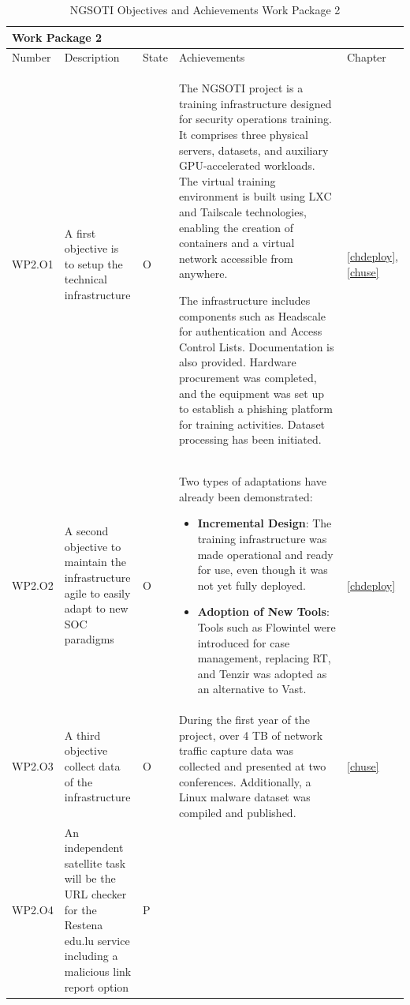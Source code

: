 \begin{table}[h]
\centering

\begin{tabular}{ |p{0.07\linewidth}  |p{0.2\linewidth}|        p{0.04\linewidth}|    p{0.62\linewidth}|  p{0.07\linewidth}|}\hline
\multicolumn{5}{|p{0.97\linewidth}|}{Work Package 2} \\
\hline
                  Number             & Description & State & Achievements & Chapter \\
\hline
WP2.O1 &
A first objective is to setup the technical infrastructure & O &

The NGSOTI project is a training infrastructure designed for security
operations training. It comprises three physical servers, datasets, and
auxiliary GPU-accelerated workloads. The virtual training environment is
built using LXC and Tailscale technologies, enabling the creation of
containers and a virtual network accessible from anywhere.

The infrastructure includes components such as Headscale for authentication
and Access Control Lists. Documentation is also provided. Hardware
procurement was completed, and the equipment was set up to establish a
phishing platform for training activities. Dataset processing has been
initiated.

&
\ref{chdeploy},\ref{chuse} \\
\hline
WP2.O2 &
A second objective to maintain the infrastructure agile to easily adapt to new
SOC paradigms
&O &
Two types of adaptations have already been demonstrated:
\begin{itemize}
    \item \textbf{Incremental Design}: The training infrastructure was made
    operational and ready for use, even though it was not yet fully deployed.
    \item \textbf{Adoption of New Tools}: Tools such as Flowintel were introduced
    for case management, replacing RT, and Tenzir was adopted as an alternative
    to Vast.
\end{itemize}

&
\ref{chdeploy}
\\

\hline

WP2.O3 &
A third objective collect data of the infrastructure
& O &
During the first year of the project, over 4 TB of network traffic capture data was collected and presented at two conferences. Additionally, a Linux malware dataset was compiled and published.
&
\ref{chuse}
\\

\hline

WP2.O4 &
An independent satellite task will be the URL checker for the Restena edu.lu
service including a malicious link report
option
& P &
&
\\
\hline
\end{tabular}
\caption{NGSOTI Objectives and Achievements Work Package 2}
\label{oa2}
\end{table}


